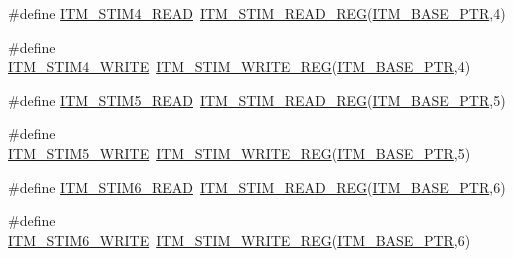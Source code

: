 \begin{DoxyCompactItemize}
\item 
\#define \hyperlink{group___i_t_m___register___accessor___macros_ga7bc9ebee3625b9f578807478ac2a35fc}{I\+T\+M\+\_\+\+S\+T\+I\+M4\+\_\+\+R\+E\+AD}~\hyperlink{group___i_t_m___register___accessor___macros_ga5009882336aadcd4f37b45cf3395c450}{I\+T\+M\+\_\+\+S\+T\+I\+M\+\_\+\+R\+E\+A\+D\+\_\+\+R\+EG}(\hyperlink{group___i_t_m___peripheral_gafaddee8fe8b6a898d4e5edc43ee0d703}{I\+T\+M\+\_\+\+B\+A\+S\+E\+\_\+\+P\+TR},4)
\item 
\#define \hyperlink{group___i_t_m___register___accessor___macros_ga15f21956568cb77bc35327f9f4742b0f}{I\+T\+M\+\_\+\+S\+T\+I\+M4\+\_\+\+W\+R\+I\+TE}~\hyperlink{group___i_t_m___register___accessor___macros_ga049ca92a4e78e77c19af81e51aa73f1c}{I\+T\+M\+\_\+\+S\+T\+I\+M\+\_\+\+W\+R\+I\+T\+E\+\_\+\+R\+EG}(\hyperlink{group___i_t_m___peripheral_gafaddee8fe8b6a898d4e5edc43ee0d703}{I\+T\+M\+\_\+\+B\+A\+S\+E\+\_\+\+P\+TR},4)
\item 
\#define \hyperlink{group___i_t_m___register___accessor___macros_ga71729386b6675413e54bbae85ca5f6b4}{I\+T\+M\+\_\+\+S\+T\+I\+M5\+\_\+\+R\+E\+AD}~\hyperlink{group___i_t_m___register___accessor___macros_ga5009882336aadcd4f37b45cf3395c450}{I\+T\+M\+\_\+\+S\+T\+I\+M\+\_\+\+R\+E\+A\+D\+\_\+\+R\+EG}(\hyperlink{group___i_t_m___peripheral_gafaddee8fe8b6a898d4e5edc43ee0d703}{I\+T\+M\+\_\+\+B\+A\+S\+E\+\_\+\+P\+TR},5)
\item 
\#define \hyperlink{group___i_t_m___register___accessor___macros_ga07b231bcf27e2a69fe3168aa387fc4b7}{I\+T\+M\+\_\+\+S\+T\+I\+M5\+\_\+\+W\+R\+I\+TE}~\hyperlink{group___i_t_m___register___accessor___macros_ga049ca92a4e78e77c19af81e51aa73f1c}{I\+T\+M\+\_\+\+S\+T\+I\+M\+\_\+\+W\+R\+I\+T\+E\+\_\+\+R\+EG}(\hyperlink{group___i_t_m___peripheral_gafaddee8fe8b6a898d4e5edc43ee0d703}{I\+T\+M\+\_\+\+B\+A\+S\+E\+\_\+\+P\+TR},5)
\item 
\#define \hyperlink{group___i_t_m___register___accessor___macros_ga8a39db72396c8cd021762dbe2def218c}{I\+T\+M\+\_\+\+S\+T\+I\+M6\+\_\+\+R\+E\+AD}~\hyperlink{group___i_t_m___register___accessor___macros_ga5009882336aadcd4f37b45cf3395c450}{I\+T\+M\+\_\+\+S\+T\+I\+M\+\_\+\+R\+E\+A\+D\+\_\+\+R\+EG}(\hyperlink{group___i_t_m___peripheral_gafaddee8fe8b6a898d4e5edc43ee0d703}{I\+T\+M\+\_\+\+B\+A\+S\+E\+\_\+\+P\+TR},6)
\item 
\#define \hyperlink{group___i_t_m___register___accessor___macros_gab5f100af2978bf54186d5754e9676f5d}{I\+T\+M\+\_\+\+S\+T\+I\+M6\+\_\+\+W\+R\+I\+TE}~\hyperlink{group___i_t_m___register___accessor___macros_ga049ca92a4e78e77c19af81e51aa73f1c}{I\+T\+M\+\_\+\+S\+T\+I\+M\+\_\+\+W\+R\+I\+T\+E\+\_\+\+R\+EG}(\hyperlink{group___i_t_m___peripheral_gafaddee8fe8b6a898d4e5edc43ee0d703}{I\+T\+M\+\_\+\+B\+A\+S\+E\+\_\+\+P\+TR},6)

\end{DoxyCompactItemize}

